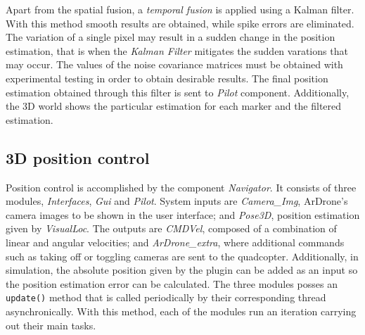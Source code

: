 \documentclass{styles/svproc}
\begin{document}
	
	
	


	
        Apart from the spatial fusion, a \textit{temporal fusion} is applied using a Kalman filter. With this method smooth results are obtained, while spike errors are eliminated. The variation of a single pixel may result in a sudden change in the position estimation, that is when the \textit{Kalman Filter} mitigates the sudden varations that may occur. The values of the noise covariance matrices must be obtained with experimental testing in order to obtain desirable results. The final position estimation obtained through this filter is sent to \textit{Pilot} component. Additionally, the 3D world shows the particular estimation for each marker and the filtered estimation.
	
\subsection{3D position control}

	Position control is accomplished by the component \textit{Navigator}. It consists of three modules, \textit{Interfaces}, \textit{Gui} and \textit{Pilot}. System inputs are \textit{Camera\_Img}, ArDrone's camera images to be shown in the user interface; and \textit{Pose3D}, position estimation given by \textit{VisualLoc}. The outputs are \textit{CMDVel}, composed of a combination of linear and angular velocities; and \textit{ArDrone\_extra}, where additional commands such as taking off or toggling cameras are sent to the quadcopter. Additionally, in simulation, the absolute position given by the plugin can be added as an input so the position estimation error can be calculated. The three modules posses an \texttt{update()} method that is called periodically by their corresponding thread asynchronically. With this method, each of the modules run an iteration carrying out their main tasks.
	
\end{document}
